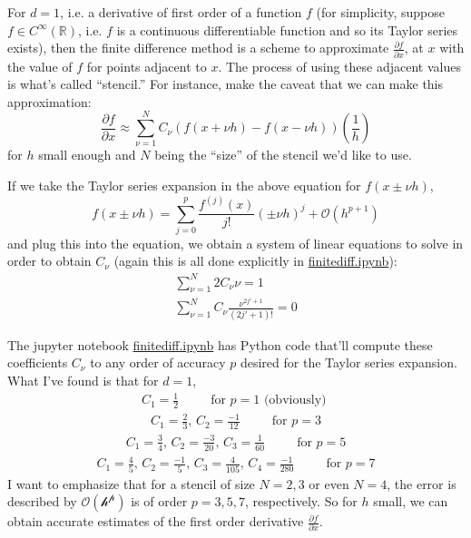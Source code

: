\documentclass[10pt]{amsart}
\begin{document}
For $d=1$, i.e. a derivative of first order of a function $f$ (for simplicity, suppose $f\in C^{\infty}(\mathbb{R})$, i.e. $f$ is a continuous differentiable function and so its Taylor series exists), then the finite difference method is a scheme to approximate $\frac{ \partial f}{ \partial x}$, at $x$ with the value of $f$ for points adjacent to $x$.  The process of using these adjacent values is what's called ``stencil.''  For instance, make the caveat that we can make this approximation:
\begin{equation}
 \frac{ \partial f}{ \partial x} \approx \sum_{\nu = 1}^N C_{\nu}(f(x+\nu h) - f(x-\nu h)) \left( \frac{1}{h} \right)
\end{equation}
for $h$ small enough and $N$ being the ``size'' of the stencil we'd like to use.

If we take the Taylor series expansion in the above equation for $f(x \pm \nu h)$,
\[
f(x\pm \nu h) = \sum_{j=0}^p \frac{ f^{(j)}(x) }{ j!} (\pm \nu h)^j + \mathcal{O}(h^{p+1})
\]
and plug this into the equation, we obtain a system of linear equations to solve in order to obtain $C_{\nu}$ (again this is all done explicitly in \href{https://nbviewer.jupyter.org/github/ernestyalumni/CompPhys/blob/master/finitediff.ipynb}{finitediff.ipynb}):
\[
\begin{gathered}
  \sum_{\nu = 1}^N 2C_{\nu} \nu  = 1 \\ 
 \sum_{\nu = 1}^N C_{\nu} \frac{ \nu^{2j' + 1 } }{ (2j'+1)! } =0
  \end{gathered}
\]

The jupyter notebook \href{https://nbviewer.jupyter.org/github/ernestyalumni/CompPhys/blob/master/finitediff.ipynb}{finitediff.ipynb} has Python code that'll compute these coefficients $C_{\nu}$ to any order of accuracy $p$ desired for the Taylor series expansion.  What I've found is that for $d=1$,
\[
\begin{gathered}
  C_1 = \frac{1}{2} \qquad \, \text{ for } p = 1  \text{ (obviously) }
\end{gathered}
\]
\[
\begin{gathered}
  C_1 = \frac{2}{3}, \, C_2 = \frac{-1}{12} \qquad \, \text{ for } p = 3  
\end{gathered}
\]
\[
\begin{gathered}
  C_1 = \frac{3}{4}, \, C_2 = \frac{-3}{20}, \, C_3 = \frac{1}{60} \qquad \, \text{ for } p = 5  
\end{gathered}
\]
\[
\begin{gathered}
  C_1 = \frac{4}{5}, \, C_2 = \frac{-1}{5}, \, C_3 = \frac{4}{105}, \, C_4 = \frac{-1}{280} \qquad \, \text{ for } p = 7  
\end{gathered}
\]
I want to emphasize that for a stencil of size $N=2,3$ or even $N=4$, the error is described by $\mathcal{O(h^p)}$ is of order $p=3,5,7$, respectively.  So for $h$ small, we can obtain accurate estimates of the first order derivative $\frac{ \partial f}{ \partial x}$.
\end{document}
